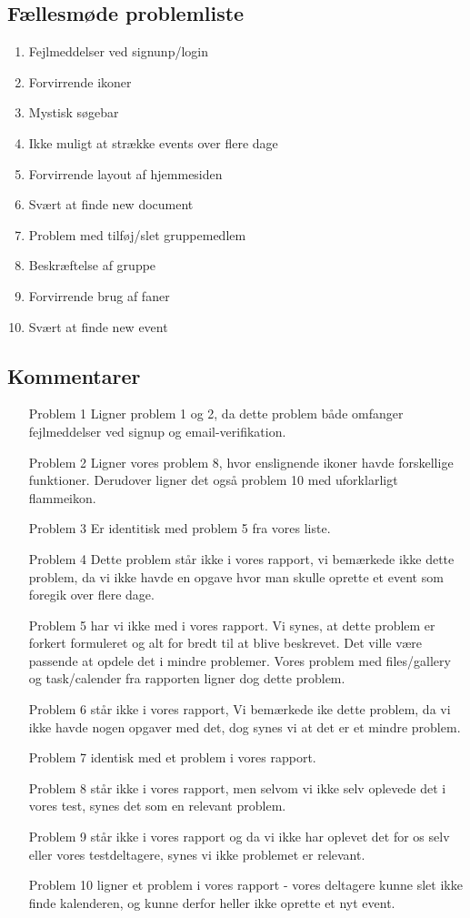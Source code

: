 \documentclass[12pt]{article}
\begin{document}
\subsection*{Fællesmøde problemliste}
\begin{enumerate}
  \item  Fejlmeddelser ved signunp/login
  \item  Forvirrende ikoner
  \item  Mystisk søgebar 
  \item  Ikke muligt at strække events over flere dage
  \item  Forvirrende layout af hjemmesiden
  \item  Svært at finde new document
  \item  Problem med tilføj/slet gruppemedlem 
  \item  Beskræftelse af gruppe 
  \item  Forvirrende brug af faner
  \item  Svært at finde new event
\end{enumerate}
\subsection*{Kommentarer}
\begin{enumerate}
  \item [Problem 1] Ligner problem 1 og 2, da dette problem både omfanger fejlmeddelser ved signup og email-verifikation.
  \item [Problem 2] Ligner vores problem 8, hvor enslignende ikoner havde forskellige funktioner. Derudover ligner det også problem 10 med uforklarligt flammeikon. 
  \item [Problem 3] Er identitisk med problem 5 fra vores liste.
  \item [Problem 4] Dette problem står ikke i vores rapport, vi bemærkede ikke dette problem, da vi ikke havde en opgave hvor man skulle oprette et event som foregik over flere dage.
  \item [Problem 5] har vi ikke med i vores rapport. Vi synes, at dette problem er forkert formuleret og alt for bredt til at blive beskrevet. Det ville være passende at opdele det i mindre problemer. Vores problem med files/gallery og task/calender fra rapporten ligner dog dette problem.
  \item [Problem 6] står ikke i vores rapport, Vi bemærkede ike dette problem, da vi ikke havde nogen opgaver med det, dog synes vi at det er et mindre problem.
  \item [Problem 7] identisk med et problem i vores rapport.
  \item [Problem 8] står ikke i vores rapport, men selvom vi ikke selv oplevede det i vores test, synes det som en relevant problem.
  \item [Problem 9] står ikke i vores rapport og da vi ikke har oplevet det for os selv eller vores testdeltagere, synes vi ikke problemet er relevant.
  \item [Problem 10] ligner et problem i vores rapport - vores deltagere kunne slet ikke finde kalenderen, og kunne derfor heller ikke oprette et nyt event.
   
\end{enumerate}
\end{document}
